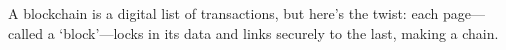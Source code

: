 \documentclass[preview]{standalone}
\begin{document}
\begin{center}
A blockchain is a digital list of transactions, but here’s the twist: each page—called a ‘block’—locks in its data and links securely to the last, making a chain.
\end{center}
\end{document}
